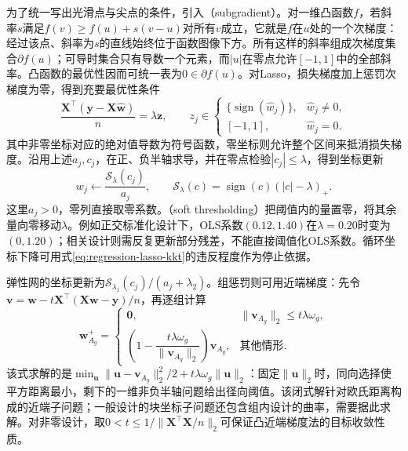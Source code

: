 为了统一写出光滑点与尖点的条件，引入（subgradient）。对一维凸函数$f$，若斜率$s$满足$f(v)\geq f(u)+s(v-u)$对所有$v$成立，它就是$f$在$u$处的一个次梯度：经过该点、斜率为$s$的直线始终位于函数图像下方。所有这样的斜率组成次梯度集合$\partial f(u)$；可导时集合只有导数一个元素，而$|u|$在零点允许$[-1,1]$中的全部斜率。凸函数的最优性因而可统一表为$0\in\partial f(u)$。对Lasso，损失梯度加上惩罚次梯度为零，得到充要最优性条件
\begin{equation}
  \frac{\bm{X}^{\top}(\bm{y}-\bm{X}\widehat{\bm{w}})}{n}
  =\lambda\bm{z},\qquad
  z_j\in
  \begin{cases}
    \{\operatorname{sign}(\widehat w_j)\},&\widehat w_j\ne0,\\
    [-1,1],&\widehat w_j=0.
  \end{cases}
  \label{eq:regression-lasso-kkt}
\end{equation}
其中非零坐标对应的绝对值导数为符号函数，零坐标则允许整个区间来抵消损失梯度。沿用上述$a_j,c_j$，在正、负半轴求导，并在零点检验$|c_j|\leq\lambda$，得到坐标更新
\begin{equation}
  w_j\leftarrow\frac{\mathcal{S}_{\lambda}(c_j)}{a_j},
  \qquad
  \mathcal{S}_{\lambda}(c)=\operatorname{sign}(c)(|c|-\lambda)_+.
  \label{eq:regression-soft-threshold}
\end{equation}
这里$a_j>0$，零列直接取零系数。（soft thresholding）把阈值内的量置零，将其余量向零移动$\lambda$。例如正交标准化设计下，OLS系数$(0.12,1.40)$在$\lambda=0.20$时变为$(0,1.20)$；相关设计则需反复更新部分残差，不能直接阈值化OLS系数。循环坐标下降可用式\eqref{eq:regression-lasso-kkt}的违反程度作为停止依据。

弹性网的坐标更新为$\mathcal{S}_{\lambda_1}(c_j)/(a_j+\lambda_2)$。组惩罚则可用近端梯度：先令$\bm{v}=\bm{w}-t\bm{X}^{\top}(\bm{X}\bm{w}-\bm{y})/n$，再逐组计算
\begin{equation}
  \bm{w}_{A_g}^{+}
  =
  \begin{cases}
    \bm{0},&\lVert\bm{v}_{A_g}\rVert_2\leq t\lambda\omega_g,\\
    \left(1-\dfrac{t\lambda\omega_g}{\lVert\bm{v}_{A_g}\rVert_2}\right)
      \bm{v}_{A_g},&\text{其他情形}.
  \end{cases}
  \label{eq:regression-group-prox}
\end{equation}
该式求解的是$\min_{\bm{u}}\lVert\bm{u}-\bm{v}_{A_g}\rVert_2^2/2+t\lambda\omega_g\lVert\bm{u}\rVert_2$：固定$\lVert\bm{u}\rVert_2$时，同向选择使平方距离最小，剩下的一维非负半轴问题给出径向阈值。该闭式解针对欧氏距离构成的近端子问题；一般设计的块坐标子问题还包含组内设计的曲率，需要据此求解。对非零设计，取$0<t\leq1/\lVert\bm{X}^{\top}\bm{X}/n\rVert_2$可保证凸近端梯度法的目标收敛性质。

